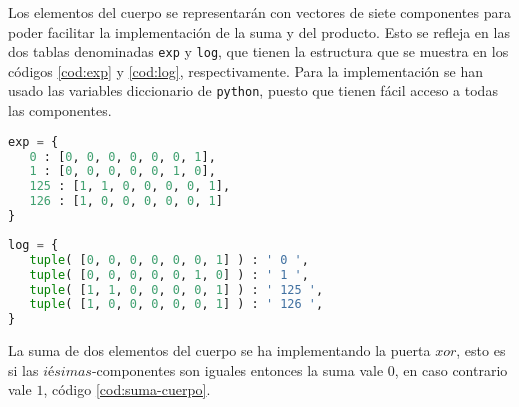 Los elementos del cuerpo se representarán con vectores de siete componentes para poder facilitar la implementación de la suma y del producto. Esto se refleja en las dos tablas denominadas \texttt{exp} y \texttt{log}, que tienen la estructura que se muestra en los códigos \ref{cod:exp} y \ref{cod:log}, respectivamente. Para la implementación se han usado las variables diccionario de \texttt{python}, puesto que tienen fácil acceso a todas las componentes.

\vspace{0.25cm}

\begin{lstlisting}[language=Python,caption=Tabla para calcular la potencia en $\mathds{F}_{128}$, label=cod:exp]
exp = {
   0 : [0, 0, 0, 0, 0, 0, 1],
   1 : [0, 0, 0, 0, 0, 1, 0],
   125 : [1, 1, 0, 0, 0, 0, 1],
   126 : [1, 0, 0, 0, 0, 0, 1]
}

\end{lstlisting}

\begin{lstlisting}[language=Python,caption=Tabla para calcular el logaritmo en $\mathds{F}_{128}$, label=cod:log]
log = {
   tuple( [0, 0, 0, 0, 0, 0, 1] ) : ' 0 ',
   tuple( [0, 0, 0, 0, 0, 1, 0] ) : ' 1 ',
   tuple( [1, 1, 0, 0, 0, 0, 1] ) : ' 125 ',
   tuple( [1, 0, 0, 0, 0, 0, 1] ) : ' 126 ',
}
\end{lstlisting}

La suma de dos elementos del cuerpo se ha implementando la puerta $xor$, esto es si las $iésimas$-componentes son iguales entonces la suma vale $0$, en caso contrario vale $1$, código \ref{cod:suma-cuerpo}.

\begin{table}[H]
	\begin{center}
	\centering
	\end{center}
	\caption{Parámetros de la función \texttt{suma}}
\end{table}

